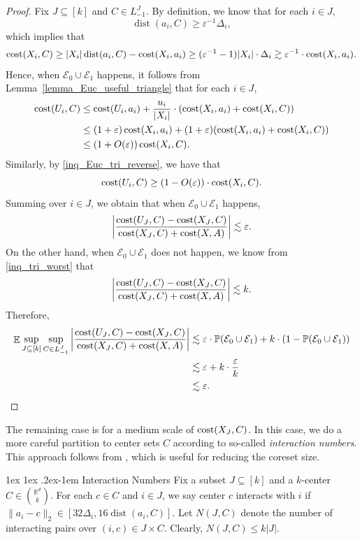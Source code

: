\documentclass[11pt,letterpaper]{article}
\makeatletter
\renewcommand{\paragraph}{%
  \@startsection{paragraph}{4}%
  {\z@}{1ex \@plus 1ex \@minus .2ex}{-1em}%
  {\normalfont\normalsize\bfseries}%
}
\theoremstyle{definition}
\newcommand{\eps}{\varepsilon}
\DeclareMathOperator*{\E}{\ensuremath{\mathbb{E}}}
\DeclareMathOperator{\dist}{dist}
\makeatother
\begin{document}
\begin{proof}
Fix $J\subseteq[k]$ and $C\in L_{-1}^J$. By definition, we know that for each $i\in J$, 
\[
    \dist(a_i,C)\geq \eps^{-1}\Delta_i,
\]
which implies that
\[
    \cost(X_i,C)\geq |X_i|\dist(a_i,C)-\cost(X_i,a_i)\geq (\eps^{-1}-1)|X_i|\cdot \Delta_i\gtrsim \eps^{-1}\cdot \cost(X_i,a_i).
\]
Hence, when $\mathcal{E}_0\cup\mathcal{E}_1$ happens, it follows from Lemma~\ref{lemma_Euc_useful_triangle} that for each $i\in J$,
\begin{align*}
\cost(U_i,C)&\leq \cost(U_i,a_i)+\frac{u_i}{|X_i|}\cdot (\cost(X_i,a_i)+\cost(X_i,C))\\
&\leq
(1+\eps)  \cost(X_i,a_i)+(1+\eps)(\cost(X_i,a_i)+\cost(X_i,C))\\
&\leq
(1+O(\eps)) \cost(X_i,C).
\end{align*}
%
Similarly, by \eqref{inq_Euc_tri_reverse}, we have that
$$
\cost(U_i,C)\geq (1-O(\eps))\cdot \cost(X_i,C).
$$
%
Summing over $i\in J$, we obtain that when $\mathcal{E}_0\cup\mathcal{E}_1$ happens,
$$
\bigg|\frac{\cost(U_J,C)-\cost(X_J,C)}{\cost(X_J,C)+\cost(X,A)}\bigg|\lesssim \eps.
$$
%
On the other hand, when $\mathcal{E}_0\cup\mathcal{E}_1$ does not happen, we know from \eqref{inq_tri_worst} that
$$
\bigg|\frac{\cost(U_J,C)-\cost(X_J,C)}{\cost(X_J,C)+\cost(X,A)}\bigg|\lesssim k.
$$
Therefore,
\begin{align*}
 \E\sup_{J\subseteq[k]}\sup_{C\in L^J_{-1}} \bigg|\frac{\cost(U_J,C)-\cost(X_J,C)}{\cost(X_J,C)+\cost(X,A)}\bigg|
&\lesssim \eps\cdot \mathbb{P}(\mathcal{E}_0\cup\mathcal{E}_1)+k\cdot (1-\mathbb{P}(\mathcal{E}_0\cup\mathcal{E}_1))\\
&\lesssim \eps+k\cdot\frac{\eps}{k}\\
&\lesssim \eps. \qedhere
\end{align*}
\end{proof}

The remaining case is for a medium scale of $\cost(X_J,C)$.
%
In this case, we do a more careful partition to center sets $C$ according to so-called \emph{interaction numbers}.
%
This approach follows from \cite{bansal2024sensitivity}, which is useful for reducing the coreset size.

\paragraph{Interaction Numbers} Fix a subset $J\subseteq [k]$ and a $k$-center $C\in \binom{\mathbb{R}^d}{k}$. For each $c\in C$ and $i\in J$, we say center $c$ interacts with $i$ if $\|a_i-c\|_2\in [32\Delta_i,16\dist(a_i,C)]$. Let $N(J,C)$ denote the number of interacting pairs over $(i,c)\in J\times C$. Clearly, $N(J,C)\leq k|J|$. 
\end{document}

